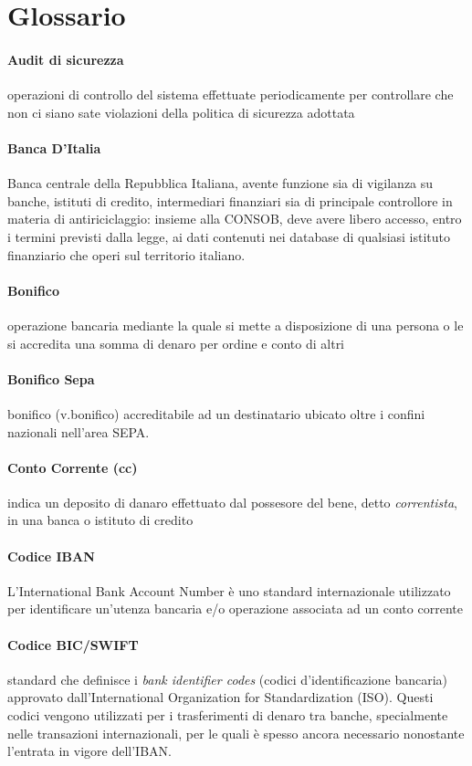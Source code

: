 \section{Glossario}

\paragraph{Audit di sicurezza} 
	operazioni di controllo del sistema effettuate periodicamente per controllare che non ci siano sate violazioni della politica di sicurezza adottata
\paragraph{Banca D'Italia}
	 Banca centrale della Repubblica Italiana, avente funzione sia di vigilanza su banche, istituti di credito, intermediari finanziari sia di principale controllore in materia di antiriciclaggio: insieme alla CONSOB, deve avere libero accesso, entro i termini previsti dalla legge, ai dati contenuti nei database di qualsiasi istituto finanziario che operi sul territorio italiano. \cite{banca_italia}
\paragraph{Bonifico}     
	operazione bancaria mediante la quale si mette a disposizione di una persona o le si accredita una somma di denaro per ordine e conto di altri
\paragraph{Bonifico Sepa}
	bonifico (v.bonifico) accreditabile ad un destinatario ubicato oltre i confini nazionali nell'area SEPA.
\paragraph{Conto Corrente (cc)}
	indica un deposito di danaro effettuato dal possesore del bene, detto \emph{correntista}, in una banca o istituto di credito
\paragraph{Codice IBAN}
	L'International Bank Account Number è uno standard internazionale utilizzato per identificare un'utenza bancaria e/o operazione associata ad un conto corrente 
\paragraph{Codice BIC/SWIFT}
	standard che definisce i \emph{bank identifier codes} (codici d'identificazione bancaria) approvato dall'International Organization for Standardization (ISO). Questi codici vengono utilizzati per i trasferimenti di denaro tra banche, specialmente nelle transazioni internazionali, per le quali è spesso ancora necessario nonostante l'entrata in vigore dell'IBAN. \cite{bic_wiki}
